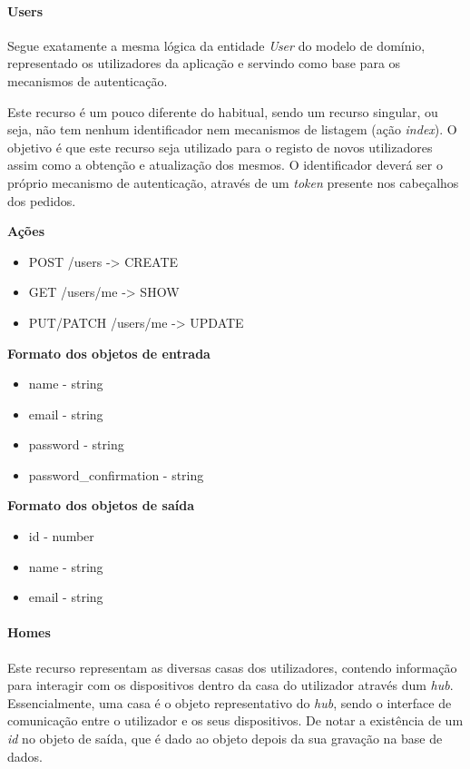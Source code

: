 \paragraph*{Users}

Segue exatamente a mesma lógica da entidade \textit{User} do modelo de domínio, representado os utilizadores da aplicação e servindo como base para os mecanismos de autenticação.

Este recurso é um pouco diferente do habitual, sendo um recurso singular, ou seja, não tem nenhum identificador nem mecanismos de listagem (ação \textit{index}). O objetivo é que este recurso seja utilizado para o registo de novos utilizadores assim como a obtenção e atualização dos mesmos. O identificador deverá ser o próprio mecanismo de autenticação, através de um \textit{token} presente nos cabeçalhos dos pedidos.

\textbf{Ações}
\begin{itemize}
    \item POST /users -> CREATE
    \item GET /users/me -> SHOW
    \item PUT/PATCH /users/me -> UPDATE
\end{itemize}

\textbf{Formato dos objetos de entrada}
\begin{itemize}
    \item name - string
    \item email - string
    \item password - string
    \item password{\_}confirmation - string
\end{itemize}

\textbf{Formato dos objetos de saída}
\begin{itemize}
    \item id - number
    \item name - string
    \item email - string
\end{itemize}

\paragraph*{Homes}

Este recurso representam as diversas casas dos utilizadores, contendo informação para interagir com os dispositivos dentro da casa do utilizador através dum \textit{hub}. Essencialmente, uma casa é o objeto representativo do \textit{hub}, sendo o interface de comunicação entre o utilizador e os seus dispositivos. De notar a existência de um \textit{id} no objeto de saída, que é dado ao objeto depois da sua gravação na base de dados.

